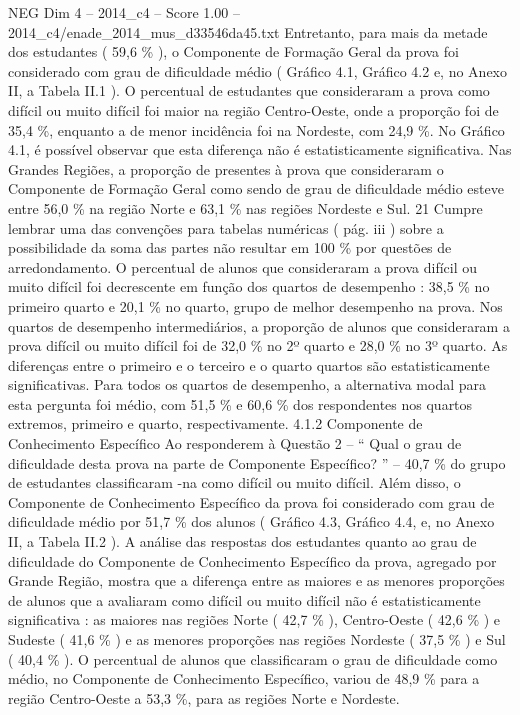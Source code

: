 \begin{textsample}{NEG Dim 4 – 2014\_c4 – Score 1.00 – 2014\_c4/enade\_2014\_mus\_d33546da45.txt}
Entretanto, para mais da metade dos estudantes ( 59,6 \% ), o Componente de Formação Geral da prova foi considerado com grau de dificuldade médio ( Gráfico 4.1, Gráfico 4.2 e, no Anexo II, a Tabela II.1 ).
O percentual de estudantes que consideraram a prova como difícil ou muito difícil foi maior na região Centro-Oeste, onde a proporção foi de 35,4 \%, enquanto a de menor incidência foi na Nordeste, com 24,9 \%.
No Gráfico 4.1, é possível observar que esta diferença não é estatisticamente significativa.
Nas Grandes Regiões, a proporção de presentes à prova que consideraram o Componente de Formação Geral como sendo de grau de dificuldade médio esteve entre 56,0 \% na região Norte e 63,1 \% nas regiões Nordeste e Sul. 21 Cumpre lembrar uma das convenções para tabelas numéricas ( pág. iii ) sobre a possibilidade da soma das partes não resultar em 100 \% por questões de arredondamento.
O percentual de alunos que consideraram a prova difícil ou muito difícil foi decrescente em função dos quartos de desempenho : 38,5 \% no primeiro quarto e 20,1 \% no quarto, grupo de melhor desempenho na prova.
Nos quartos de desempenho intermediários, a proporção de alunos que consideraram a prova difícil ou muito difícil foi de 32,0 \% no 2º quarto e 28,0 \% no 3º quarto.
As diferenças entre o primeiro e o terceiro e o quarto quartos são estatisticamente significativas.
Para todos os quartos de desempenho, a alternativa modal para esta pergunta foi médio, com 51,5 \% e 60,6 \% dos respondentes nos quartos extremos, primeiro e quarto, respectivamente. 4.1.2 Componente de Conhecimento Específico Ao responderem à Questão 2 – “ Qual o grau de dificuldade desta prova na parte de Componente Específico? ” – 40,7 \% do grupo de estudantes classificaram -na como difícil ou muito difícil.
Além disso, o Componente de Conhecimento Específico da prova foi considerado com grau de dificuldade médio por 51,7 \% dos alunos ( Gráfico 4.3, Gráfico 4.4, e, no Anexo II, a Tabela II.2 ).
A análise das respostas dos estudantes quanto ao grau de dificuldade do Componente de Conhecimento Específico da prova, agregado por Grande Região, mostra que a diferença entre as maiores e as menores proporções de alunos que a avaliaram como difícil ou muito difícil não é estatisticamente significativa : as maiores nas regiões Norte ( 42,7 \% ), Centro-Oeste ( 42,6 \% ) e Sudeste ( 41,6 \% ) e as menores proporções nas regiões Nordeste ( 37,5 \% ) e Sul ( 40,4 \% ).
O percentual de alunos que classificaram o grau de dificuldade como médio, no Componente de Conhecimento Específico, variou de 48,9 \% para a região Centro-Oeste a 53,3 \%, para as regiões Norte e Nordeste.

\end{textsample}
